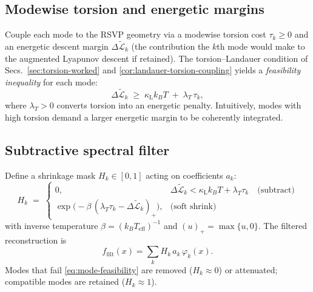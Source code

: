 \documentclass[a4paper,11pt]{article}
\begin{document}
\subsection{Modewise torsion and energetic margins}
Couple each mode to the RSVP geometry via a modewise torsion cost $\tau_k\ge0$
and an energetic descent margin $\Delta\widetilde{\mathcal{L}}_k$ (the
contribution the $k$th mode would make to the augmented Lyapunov descent if
retained). The torsion--Landauer condition of Secs.~\ref{sec:torsion-worked}
and \ref{cor:landauer-torsion-coupling} yields a \emph{feasibility inequality}
for each mode:
\begin{equation}
\label{eq:mode-feasibility}
\Delta\widetilde{\mathcal{L}}_k \;\ge\; \kappa_{\mathrm L} k_B T \;+\; \lambda_T\,\tau_k,
\end{equation}
where $\lambda_T>0$ converts torsion into an energetic penalty. Intuitively,
modes with high torsion demand a larger energetic margin to be coherently
integrated.

\subsection{Subtractive spectral filter}
Define a shrinkage mask $H_k\in[0,1]$ acting on coefficients $a_k$:
\begin{equation}
\label{eq:hard-soft-mask}
H_k \;=\;
\begin{cases}
0, & \Delta\widetilde{\mathcal{L}}_k < \kappa_{\mathrm L}k_B T + \lambda_T \tau_k \quad\text{(subtract)}\\[4pt]
\exp\!\big(-\beta\,(\lambda_T \tau_k - \Delta\widetilde{\mathcal{L}}_k)_+\big), & \text{(soft shrink)}
\end{cases}
\end{equation}
with inverse temperature $\beta=(k_B T_{\mathrm{eff}})^{-1}$ and $(u)_+=\max\{u,0\}$.
The filtered reconstruction is
\begin{equation}
\label{eq:filtered-recon}
f_{\mathrm{filt}}(x)=\sum_{k} H_k\,a_k\,\varphi_k(x).
\end{equation}
Modes that fail \eqref{eq:mode-feasibility} are removed ($H_k\approx0$) or
attenuated; compatible modes are retained ($H_k\approx1$).
\end{document}
